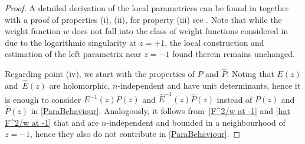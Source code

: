 \documentclass[11pt]{article}
\numberwithin{equation}{section}
\newcommand{\bP}{P}
\newcommand{\hP}{{\widehat P}}
\newcommand{\hF}{\widehat F}
\numberwithin{equation}{section}
\begin{document}
\begin{proof}
A detailed derivation of the local parametrices can be found in \cite[Section~6]{KMVV} together with a proof of properties (i), (ii), for property (iii) see \cite[Section~7]{KMVV}. Note that while the weight function $w$ does not fall into the class of weight functions considered in \cite{KMVV} due to the logarithmic singularity at $z = +1$, the local construction and estimation of the left parametrix near $z = -1$ found therein remains unchanged.

Regarding point (iv), we start with the properties of $\bP$ and $\hP$. Noting that $E(z)$ and~$\widehat E(z)$ are holomorphic, $n$-independent and have unit determinants, hence it is enough to consider $E^{-1}(z)\bP(z)$ and $\widehat E^{-1}(z)\hP(z)$ instead of $\bP(z)$ and $\hP(z)$ in \eqref{ParaBehaviour}. Analogously, it follows from~\eqref{F^2/w at -1} and \eqref{hat F^2/w at -1} that  and \smash{$\big(\frac{\hF}{\widehat W}\big)^{\sigma_3}$} are $n$-independent and bounded in a neighbourhood of $z = -1$, hence they also do not contribute in \eqref{ParaBehaviour}.


\end{proof}
\end{document}
